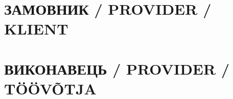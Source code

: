 \begin{paracol}{2}
  \section*{ЗАМОВНИК / PROVIDER / KLIENT}
  \switchcolumn
  \section*{ВИКОНАВЕЦЬ / PROVIDER / TÖÖVÕTJA}
  \switchcolumn*
  \switchcolumn
\end{paracol}
